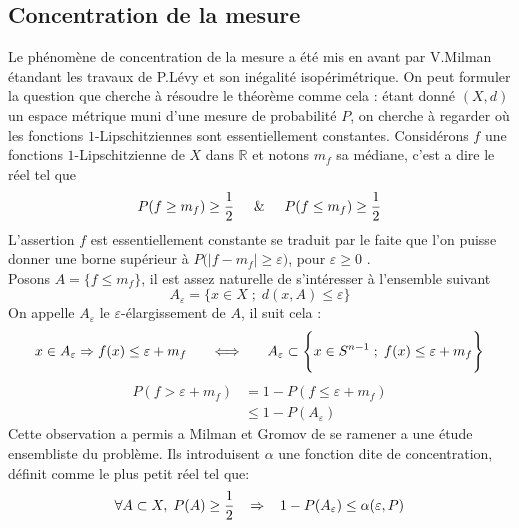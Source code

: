 \documentclass[12pt]{article}
\theoremstyle{definition}
\begin{document}
\subsection{Concentration de la mesure}
Le phénomène de concentration de la mesure a été mis en avant par V.Milman étandant les travaux de P.Lévy et son inégalité isopérimétrique. On peut formuler la question que cherche à résoudre le théorème comme cela : étant donné $(X,d)$ un espace métrique muni d'une mesure de probabilité $P$, on cherche à regarder où les fonctions $1$-Lipschitziennes sont essentiellement constantes. Considérons $f$ une fonctions $1$-Lipschitzienne de $X$ dans $\mathbb{R}$ et notons $m_f$ sa médiane, c'est a dire le réel tel que \begin{equation*}
	P(f\geq m_f)\geq \frac{1}{2} \hspace{5mm} \& \hspace{5mm} P(f\leq m_f)\geq \frac{1}{2}
\end{equation*}
L'assertion $f$ est essentiellement constante se traduit par le faite que l'on puisse donner une borne supérieur à $P\big(|f-m_f|\geq \varepsilon\big)$, pour $\varepsilon\geq 0$ .\\
Posons $A=\big\{ f\leq m_f \big\}$, il est assez naturelle de s'intéresser à l'ensemble suivant 
\begin{equation*}
	A_\varepsilon =\big\{x\in X \; ; \; d(x,A)\leq \varepsilon\big\}
\end{equation*}
On appelle $A_\varepsilon$ le $\varepsilon$-élargissement de $A$, il suit cela : 
\begin{equation*}
	x\in A_\varepsilon \Rightarrow f(x)\leq \varepsilon+m_f\hspace{5mm}\iff\hspace{5mm} A_\varepsilon \subset \Bigg\{x\in S^{n-1} \; ; \; f(x)\leq \varepsilon+m_f\Bigg\}
\end{equation*}
\begin{align*}
	P(f>\varepsilon+m_f)&= 1 - P(f\leq \varepsilon+m_f)\\
	&\leq 1 - P(A_\varepsilon)
\end{align*}
Cette observation a permis a Milman et Gromov de se ramener a une étude ensembliste du problème. Ils introduisent $\alpha$ une fonction dite de concentration, définit comme le plus petit réel tel que:
\begin{equation*}
\forall A\subset X , \; P(A)\geq \frac{1}{2}\hspace{3mm} \Rightarrow\hspace{3mm} 1-P(A_\varepsilon)\leq \alpha(\varepsilon,P)
\end{equation*}
\end{document}
